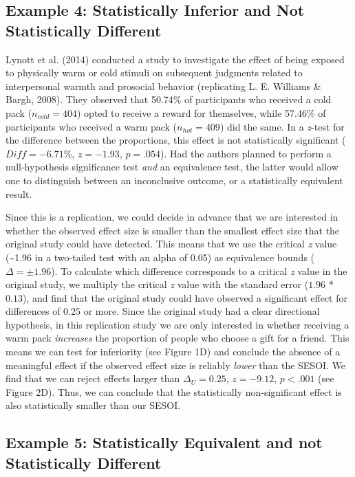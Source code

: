 \documentclass[english,floatsintext,man]{apa6}
\newcounter{author}
\theoremstyle{definition}
\theoremstyle{definition}
\theoremstyle{definition}
\theoremstyle{remark}
\begin{document}
\subsection{Example 4: Statistically Inferior and Not Statistically
Different}\label{example-4-statistically-inferior-and-not-statistically-different}

Lynott et al. (2014) conducted a study to investigate the effect of
being exposed to physically warm or cold stimuli on subsequent judgments
related to interpersonal warmth and prosocial behavior (replicating L.
E. Williams \& Bargh, 2008). They observed that 50.74\% of participants
who received a cold pack (\(n_{cold}=404\)) opted to receive a reward
for themselves, while 57.46\% of participants who received a warm pack
(\(n_{hot}=409\)) did the same. In a \emph{z}-test for the difference
between the proportions, this effect is not statistically significant
(\(\mathit{Diff}=-6.71\)\%, \(z=-1.93\), \(p=.054\)). Had the authors
planned to perform a null-hypothesis significance test \emph{and} an
equivalence test, the latter would allow one to distinguish between an
inconclusive outcome, or a statistically equivalent result.

Since this is a replication, we could decide in advance that we are
interested in whether the observed effect size is smaller than the
smallest effect size that the original study could have detected. This
means that we use the critical \emph{z} value (\textasciitilde{}1.96 in
a two-tailed test with an alpha of 0.05) as equivalence bounds
(\(\Delta = \pm 1.96\)). To calculate which difference corresponds to a
critical \emph{z} value in the original study, we multiply the critical
\emph{z} value with the standard error (\(1.96\) * \(0.13\)), and find
that the original study could have observed a significant effect for
differences of \(0.25\) or more. Since the original study had a clear
directional hypothesis, in this replication study we are only interested
in whether receiving a warm pack \emph{increases} the proportion of
people who choose a gift for a friend. This means we can test for
inferiority (see Figure 1D) and conclude the absence of a meaningful
effect if the observed effect size is reliably \emph{lower} than the
SESOI. We find that we can reject effects larger than
\(\Delta_{U} = 0.25\), \(z = -9.12\), \(p < .001\) (see Figure 2D).
Thus, we can conclude that the statistically non-significant effect is
also statistically smaller than our SESOI.

\subsection{Example 5: Statistically Equivalent and not Statistically
Different}\label{example-5-statistically-equivalent-and-not-statistically-different}
\end{document}
